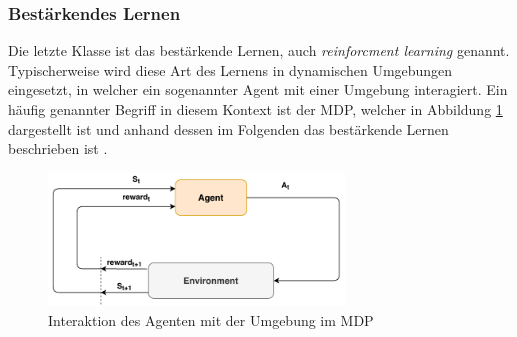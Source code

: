 \subsubsection{Bestärkendes Lernen}
\label{subsubsec:reinforcment_learning}
Die letzte Klasse ist das bestärkende Lernen, auch \emph{reinforcment learning} genannt. Typischerweise wird diese Art des Lernens in dynamischen Umgebungen eingesetzt, in welcher ein sogenannter Agent mit einer Umgebung interagiert. Ein häufig genannter Begriff in diesem Kontext ist der \ac{MDP}, welcher in Abbildung \ref{fig:mdp_problem} dargestellt ist und anhand dessen im Folgenden das bestärkende Lernen beschrieben ist \cite{sutton2018reinforcement}. 
\begin{figure}[h]
	\centering
	\includegraphics[width=0.7\textwidth]{./img/neural_network_basics/mdp.pdf} 
	\caption{Interaktion des Agenten mit der Umgebung im MDP}
	\label{fig:mdp_problem}
\end{figure}
\\ \noindent
